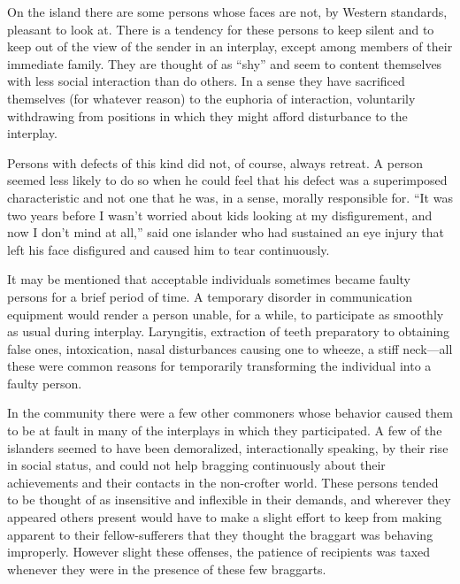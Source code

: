 \documentclass[openany,nobib]{tufte-book}
\begin{document}
On the island there are some persons whose faces are not, by Western
standards, pleasant to look at. There is a tendency for these persons to
keep silent and to keep out of the view of the sender in an interplay,
except among members of their immediate family. They are thought of as
``shy'' and seem to content themselves with less social interaction than
do others. In a sense they have sacrificed themselves (for whatever
reason) to the euphoria of interaction, voluntarily withdrawing from
positions in which they might afford disturbance to the interplay.

Persons with defects of this kind did not, of course, always retreat. A
person seemed less likely to do so when he could feel that his defect
was a superimposed characteristic and not one that he was, in a sense,
morally responsible for. ``It was two years before I wasn't worried
about kids looking at my disfigurement, and now I don't mind at all,''
said one islander who had sustained an eye injury that left his face
disfigured and caused him to tear continuously.

It may be mentioned that acceptable individuals sometimes became faulty
persons for a brief period of time. A temporary disorder in
communication equipment would render a person unable, for a while, to
participate as smoothly as usual during interplay. Laryngitis,
extraction of teeth preparatory to obtaining false ones, intoxication,
nasal disturbances causing one to wheeze, a stiff neck---all these were
common reasons for temporarily transforming the individual into a faulty
person.

In the community there were a few other commoners whose behavior caused
them to be at fault in many of the interplays in which they
participated. A few of the islanders seemed to have been demoralized,
interactionally speaking, by their rise in social status, and could not
help bragging continuously about their achievements and their contacts
in the non-crofter world. These persons tended to be thought of as
insensitive and inflexible in their demands, and wherever they appeared
others present would have to make a slight effort to keep from making
apparent to their fellow-sufferers that they thought the braggart was
behaving improperly. However slight these offenses, the patience of
recipients was taxed whenever they were in the presence of these few
braggarts.
\end{document}
